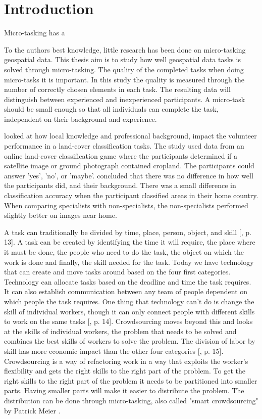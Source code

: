 \chapter{Introduction}
Micro-tasking has a  
 
 To the authors best knowledge, little research has been done on micro-tasking geospatial data. This thesis aim is to study how well geospatial data tasks is solved through micro-tasking. The quality of the completed tasks when doing micro-tasks it is important. In this study the quality is measured through the number of correctly chosen elements in each task. The resulting data will distinguish between experienced and inexperienced participants. A micro-task should be small enough so that all individuals can complete the task, independent on their background and experience. 
 
 \cite{Salk2016} looked at how local knowledge and professional background, impact the volunteer performance in a land-cover classification tasks. The study used data from an online land-cover classification game where the participants determined if a satellite image or ground photograph contained cropland. The participants could answer 'yes', 'no', or 'maybe'.  \cite{Salk2016} concluded that there was no difference in how well the participants did, and their background.%
  There was a small difference in classification accuracy when the participant classified areas in their home country. When comparing specialists with non-specialists, the non-specialists performed slightly better on images near home. 
 
A task can traditionally be divided by time, place, person, object, and skill [\citep{Meier2013}, p. 13]. A task can be created by identifying the time it will require, the place where it must be done, the people who need to do the task, the object on which the work is done and finally, the skill needed for the task. Today we have technology that can create and move tasks around based on the four first categories.  Technology can allocate tasks based on the deadline and time the task requires. It can also establish communication between any team of people dependent on which people the task requires. One thing that technology can't do is change the skill of individual workers, though it can only connect people with different skills to work on the same tasks [\citep{Meier2013}, p. 14]. Crowdsourcing moves beyond this and looks at the skills of individual workers, the problem that needs to be solved and combines the best skills of workers to solve the problem. The division of labor by skill has more economic impact than the other four categories [\citep{Meier2013}, p. 15]. Crowdsourcing is a way of refactoring work in a way that exploits the worker's flexibility and gets the right skills to the right part of the problem. To get the right skills to the right part of the problem it needs to be partitioned into smaller parts. Having smaller parts will make it easier to distribute the problem. The distribution can be done through micro-tasking, also called "smart crowdsourcing" by Patrick Meier \citep{Meier2013a}. 

